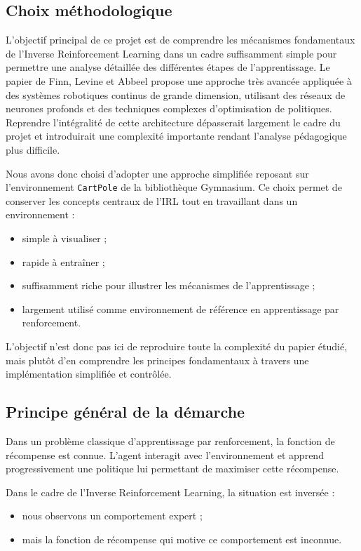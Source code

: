 \documentclass{article}
\begin{document}
\subsection{Choix méthodologique}

L’objectif principal de ce projet est de comprendre les mécanismes fondamentaux de l’Inverse Reinforcement Learning dans un cadre suffisamment simple pour permettre une analyse détaillée des différentes étapes de l’apprentissage. Le papier de Finn, Levine et Abbeel propose une approche très avancée appliquée à des systèmes robotiques continus de grande dimension, utilisant des réseaux de neurones profonds et des techniques complexes d’optimisation de politiques. Reprendre l’intégralité de cette architecture dépasserait largement le cadre du projet et introduirait une complexité importante rendant l’analyse pédagogique plus difficile.

Nous avons donc choisi d’adopter une approche simplifiée reposant sur l’environnement \texttt{CartPole} de la bibliothèque Gymnasium. Ce choix permet de conserver les concepts centraux de l’IRL tout en travaillant dans un environnement :
\begin{itemize}
    \item simple à visualiser ;
    \item rapide à entraîner ;
    \item suffisamment riche pour illustrer les mécanismes de l’apprentissage ;
    \item largement utilisé comme environnement de référence en apprentissage par renforcement.
\end{itemize}

L’objectif n’est donc pas ici de reproduire toute la complexité du papier étudié, mais plutôt d’en comprendre les principes fondamentaux à travers une implémentation simplifiée et contrôlée.

\subsection{Principe général de la démarche}

Dans un problème classique d’apprentissage par renforcement, la fonction de récompense est connue. L’agent interagit avec l’environnement et apprend progressivement une politique lui permettant de maximiser cette récompense.

Dans le cadre de l’Inverse Reinforcement Learning, la situation est inversée :
\begin{itemize}
    \item nous observons un comportement expert ;
    \item mais la fonction de récompense qui motive ce comportement est inconnue.
\end{itemize}
\end{document}
